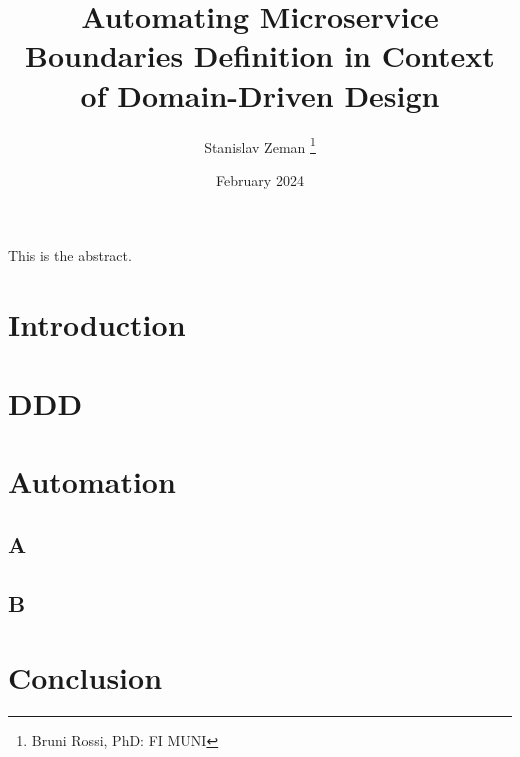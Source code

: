 \documentclass[letterpaper,12pt,leqno]{article}
\begin{document}
\title{Automating Microservice Boundaries Definition in Context of Domain-Driven Design}
\author{Stanislav Zeman
\thanks{Bruni Rossi, PhD: FI MUNI}}
\date{February 2024}                       

\begin{titlepage}
\maketitle

This is the abstract. 

\end{titlepage}

\tableofcontents

\pagebreak
\section{Introduction}\label{s:introduction}

\pagebreak
\section{DDD}\label{s:ddd}

\pagebreak
\section{Automation}\label{s:automation}

\subsection{A}\label{s:A}

\subsection{B}\label{s:B}

\pagebreak
\section{Conclusion}\label{s:conclusion}

\end{document}
